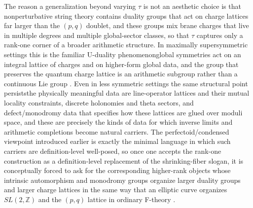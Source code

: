\documentclass[11pt]{article}
\theoremstyle{remark}
\newcommand{\Z}{\mathbb{Z}}
\begin{document}
The reason a generalization beyond varying \(\tau\) is not an aesthetic choice is that nonperturbative string theory contains duality groups that act on charge lattices far larger than the \((p,q)\) doublet, and these groups mix brane charges that live in multiple degrees and multiple global-sector classes, so that \(\tau\) captures only a rank-one corner of a broader arithmetic structure. In maximally supersymmetric settings this is the familiar U-duality phenomenon\:global symmetries act on an integral lattice of charges and on higher-form global data, and the group that preserves the quantum charge lattice is an arithmetic subgroup rather than a continuous Lie group \cite{HullTownsend1995, Witten1995}. Even in less symmetric settings the same structural point persists\:the physically meaningful data are line-operator lattices and their mutual locality constraints, discrete holonomies and theta sectors, and defect/monodromy data that specifies how these lattices are glued over moduli space, and these are precisely the kinds of data for which inverse limits and arithmetic completions become natural carriers. The perfectoid/condensed viewpoint introduced earlier is exactly the minimal language in which such carriers are definition-level well-posed, so once one accepts the rank-one construction as a definition-level replacement of the shrinking-fiber slogan, it is conceptually forced to ask for the corresponding higher-rank objects whose intrinsic automorphism and monodromy groups organize larger duality groups and larger charge lattices in the same way that an elliptic curve organizes \(SL(2,\Z)\) and the \((p,q)\) lattice in ordinary F-theory \cite{Vafa1996}.
\end{document}
